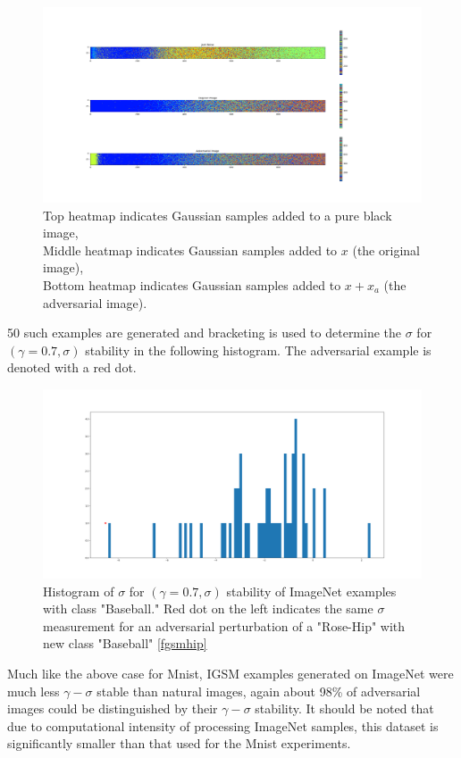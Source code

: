 \documentclass[10pt]{extarticle}
\begin{document}
\begin{figure}[H]
\includegraphics[width=14cm]{2019-04-10-adverse/50r1000x_cmap_rand.png}
\caption{Top heatmap indicates Gaussian samples added to a pure black image,\\
Middle heatmap indicates Gaussian samples added to $x$ (the original image),\\
Bottom heatmap indicates Gaussian samples added to $x + x_a$ (the adversarial image).}
\label{imnetheat}
\end{figure}

50 such examples are generated and bracketing is used to determine the $\sigma$ for $(\gamma=0.7,\sigma)$ stability in the following histogram. The adversarial example is denoted with a red dot. 
\begin{figure}[H]
\includegraphics[trim=200 80 100 100, clip,width=12cm]{2019-04-10-adverse/429-hist.png}
\caption{Histogram of $\sigma$ for $(\gamma=0.7, \sigma)$ stability of ImageNet examples with class "Baseball." Red dot on the left indicates the same $\sigma$ measurement for an adversarial perturbation of a "Rose-Hip" with new class "Baseball" \ref{fgsmhip}} 
\label{imnetfgsmsamp}
\end{figure}

Much like the above case for Mnist, IGSM examples generated on ImageNet were much less $\gamma-\sigma$ stable than natural images, again about 98\% of adversarial images could be distinguished by their $\gamma-\sigma$ stability. It should be noted that due to computational intensity of processing ImageNet samples, this dataset is significantly smaller than that used for the Mnist experiments. 
\end{document}
